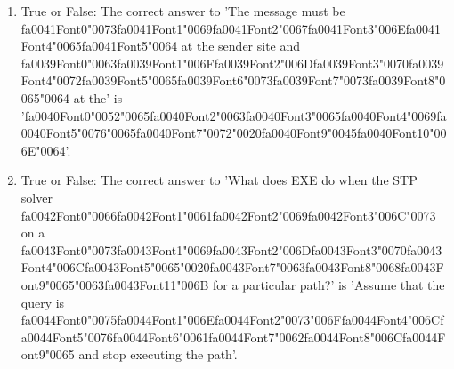 \documentclass[12pt]{article}
\begin{document}
\begin{enumerate}[label=\arabic*.]
\item True or False: The correct answer to 'The message must be {\csname fa0041Font0\endcsname\char"0073}{\csname fa0041Font1\endcsname\char"0069}{\csname fa0041Font2\endcsname\char"0067}{\csname fa0041Font3\endcsname\char"006E}{\csname fa0041Font4\endcsname\char"0065}{\csname fa0041Font5\endcsname\char"0064} at the sender site and {\csname fa0039Font0\endcsname\char"0063}{\csname fa0039Font1\endcsname\char"006F}{\csname fa0039Font2\endcsname\char"006D}{\csname fa0039Font3\endcsname\char"0070}{\csname fa0039Font4\endcsname\char"0072}{\csname fa0039Font5\endcsname\char"0065}{\csname fa0039Font6\endcsname\char"0073}{\csname fa0039Font7\endcsname\char"0073}{\csname fa0039Font8\endcsname\char"0065}{\char"0064} at the' is '{\csname fa0040Font0\endcsname\char"0052}{\char"0065}{\csname fa0040Font2\endcsname\char"0063}{\csname fa0040Font3\endcsname\char"0065}{\csname fa0040Font4\endcsname\char"0069}{\csname fa0040Font5\endcsname\char"0076}{\char"0065}{\csname fa0040Font7\endcsname\char"0072}{\char"0020}{\csname fa0040Font9\endcsname\char"0045}{\csname fa0040Font10\endcsname\char"006E}{\char"0064}'.
\item True or False: The correct answer to 'What does EXE do when the STP solver {\csname fa0042Font0\endcsname\char"0066}{\csname fa0042Font1\endcsname\char"0061}{\csname fa0042Font2\endcsname\char"0069}{\csname fa0042Font3\endcsname\char"006C}{\char"0073} on a {\csname fa0043Font0\endcsname\char"0073}{\csname fa0043Font1\endcsname\char"0069}{\csname fa0043Font2\endcsname\char"006D}{\csname fa0043Font3\endcsname\char"0070}{\csname fa0043Font4\endcsname\char"006C}{\csname fa0043Font5\endcsname\char"0065}{\char"0020}{\csname fa0043Font7\endcsname\char"0063}{\csname fa0043Font8\endcsname\char"0068}{\csname fa0043Font9\endcsname\char"0065}{\char"0063}{\csname fa0043Font11\endcsname\char"006B} for a particular path?' is 'Assume that the query is {\csname fa0044Font0\endcsname\char"0075}{\csname fa0044Font1\endcsname\char"006E}{\csname fa0044Font2\endcsname\char"0073}{\char"006F}{\csname fa0044Font4\endcsname\char"006C}{\csname fa0044Font5\endcsname\char"0076}{\csname fa0044Font6\endcsname\char"0061}{\csname fa0044Font7\endcsname\char"0062}{\csname fa0044Font8\endcsname\char"006C}{\csname fa0044Font9\endcsname\char"0065} and stop executing the path'.
\end{enumerate}
\end{document}
